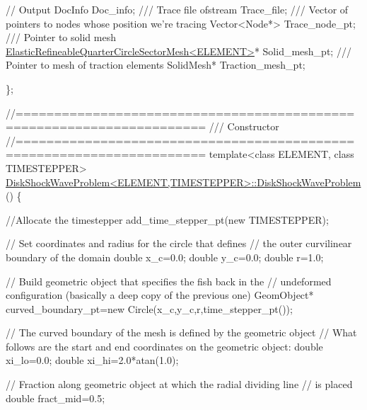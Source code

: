 \begin{DoxyCodeInclude}
 \textcolor{comment}{// Output}
 DocInfo Doc\_info;
\textcolor{comment}{}
\textcolor{comment}{ /// Trace file}
\textcolor{comment}{} ofstream Trace\_file;
 \textcolor{comment}{}
\textcolor{comment}{ /// Vector of pointers to nodes whose position we're tracing}
\textcolor{comment}{} Vector<Node*> Trace\_node\_pt;
\textcolor{comment}{}
\textcolor{comment}{ /// Pointer to solid mesh}
\textcolor{comment}{} \hyperlink{classElasticRefineableQuarterCircleSectorMesh}{ElasticRefineableQuarterCircleSectorMesh<ELEMENT>}* 
      Solid\_mesh\_pt;
\textcolor{comment}{}
\textcolor{comment}{ /// Pointer to mesh of traction elements}
\textcolor{comment}{} SolidMesh* Traction\_mesh\_pt;

\};





\textcolor{comment}{//====================================================================== }\textcolor{comment}{}
\textcolor{comment}{/// Constructor}
\textcolor{comment}{}\textcolor{comment}{//====================================================================== }
\textcolor{keyword}{template}<\textcolor{keyword}{class} ELEMENT, \textcolor{keyword}{class} TIMESTEPPER>
\hyperlink{classDiskShockWaveProblem_ae670d0120936f410134ba3e3b61aa880}{DiskShockWaveProblem<ELEMENT,TIMESTEPPER>::DiskShockWaveProblem}
      () 
\{


 \textcolor{comment}{//Allocate the timestepper}
 add\_time\_stepper\_pt(\textcolor{keyword}{new} TIMESTEPPER);
 
 \textcolor{comment}{// Set coordinates and radius for the circle that defines }
 \textcolor{comment}{// the outer curvilinear boundary of the domain}
 \textcolor{keywordtype}{double} x\_c=0.0;
 \textcolor{keywordtype}{double} y\_c=0.0;
 \textcolor{keywordtype}{double} r=1.0;
 
 \textcolor{comment}{// Build geometric object that specifies the fish back in the}
 \textcolor{comment}{// undeformed configuration (basically a deep copy of the previous one)}
 GeomObject* curved\_boundary\_pt=\textcolor{keyword}{new} Circle(x\_c,y\_c,r,time\_stepper\_pt());

 \textcolor{comment}{// The curved boundary of the mesh is defined by the geometric object}
 \textcolor{comment}{// What follows are the start and end coordinates on the geometric object:}
 \textcolor{keywordtype}{double} xi\_lo=0.0;
 \textcolor{keywordtype}{double} xi\_hi=2.0*atan(1.0);

 \textcolor{comment}{// Fraction along geometric object at which the radial dividing line}
 \textcolor{comment}{// is placed}
 \textcolor{keywordtype}{double} fract\_mid=0.5;


\end{DoxyCodeInclude}
